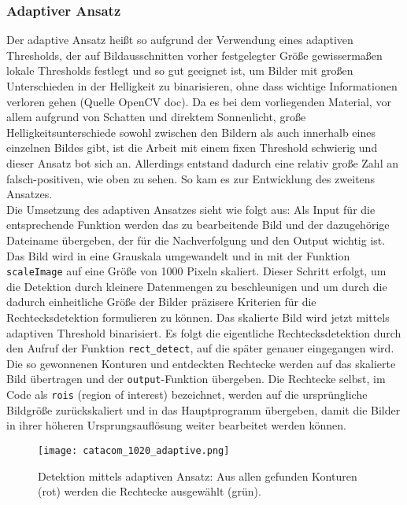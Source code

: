 \subsubsection*{Adaptiver Ansatz}
Der adaptive Ansatz heißt so aufgrund der Verwendung eines adaptiven Thresholds, der auf Bildausschnitten vorher festgelegter Größe gewissermaßen lokale Thresholds festlegt und so gut geeignet ist, um Bilder mit großen Unterschieden in der Helligkeit zu binarisieren, ohne dass wichtige Informationen verloren gehen (Quelle OpenCV doc). Da es bei dem vorliegenden Material, vor allem aufgrund von Schatten und direktem Sonnenlicht, große Helligkeitsunterschiede sowohl zwischen den Bildern als auch innerhalb eines einzelnen Bildes gibt, ist die Arbeit mit einem fixen Threshold schwierig und dieser Ansatz bot sich an. Allerdings entstand dadurch eine relativ große Zahl an falsch-positiven, wie oben zu sehen. So kam es zur Entwicklung des zweitens Ansatzes.\\
Die Umsetzung des adaptiven Ansatzes sieht wie folgt aus:
Als Input für die entsprechende Funktion werden das zu bearbeitende Bild und der dazugehörige Dateiname übergeben, der für die Nachverfolgung und den Output wichtig ist. Das Bild wird in eine Grauskala umgewandelt und in mit der Funktion \verb|scaleImage| auf eine Größe von 1000 Pixeln skaliert. Dieser Schritt erfolgt, um die Detektion durch kleinere Datenmengen zu beschleunigen und um durch die dadurch einheitliche Größe der Bilder präzisere Kriterien für die Rechtecksdetektion formulieren zu können. Das skalierte Bild wird jetzt mittels adaptiven Threshold binarisiert. Es folgt die eigentliche Rechtecksdetektion durch den Aufruf der Funktion \verb|rect_detect|, auf die später genauer eingegangen wird. Die so gewonnenen Konturen und entdeckten Rechtecke werden auf das skalierte Bild übertragen und der \verb|output|-Funktion übergeben. Die Rechtecke selbst, im Code als \verb|rois| (region of interest) bezeichnet, werden auf die ursprüngliche Bildgröße zurückskaliert und in das Hauptprogramm übergeben, damit die Bilder in ihrer höheren Ursprungsauflösung weiter bearbeitet werden können.
\begin{SCfigure}[0.5][h!]
\caption{Detektion mittels adaptiven Ansatz: Aus allen gefunden Konturen (rot) werden die Rechtecke ausgewählt (grün).}
\texttt{[image: catacom\_1020\_adaptive.png]}
\end{SCfigure}

